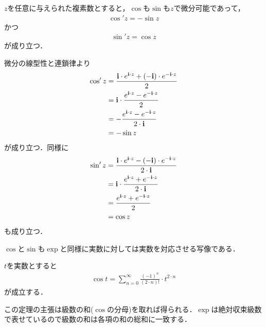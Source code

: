 	\begin{screen}
		\begin{thm}
		\label{thm:derivatives_of_trigonometric_functions}
			$z$を任意に与えられた複素数とすると，$\cos$も$\sin$も$z$で微分可能であって，
			\begin{align}
				\cos'{z} = - \sin{z}
			\end{align}
			かつ
			\begin{align}
				\sin'{z} = \cos{z}
			\end{align}
			が成り立つ．
		\end{thm}
	\end{screen}
	
	\begin{sketch}
		微分の線型性と連鎖律より
		\begin{align}
			\cos'{z}
			&= \frac{\mathbf{i} \cdot e^{\mathbf{i} \cdot z} + (-\mathbf{i}) \cdot e^{-\mathbf{i} \cdot z}}{2} \\
			&= \mathbf{i} \cdot \frac{e^{\mathbf{i} \cdot z} - e^{-\mathbf{i} \cdot z}}{2} \\
			&= -\frac{e^{\mathbf{i} \cdot z} - e^{-\mathbf{i} \cdot z}}{2 \cdot \mathbf{i}} \\
			&= -\sin{z}
		\end{align}
		が成り立つ．同様に
		\begin{align}
			\sin'{z}
			&= \frac{\mathbf{i} \cdot e^{\mathbf{i} \cdot z} - (-\mathbf{i}) \cdot e^{-\mathbf{i} \cdot z}}{2 \cdot \mathbf{i}} \\
			&= \mathbf{i} \cdot \frac{e^{\mathbf{i} \cdot z} + e^{-\mathbf{i} \cdot z}}{2 \cdot \mathbf{i}} \\
			&= \frac{e^{\mathbf{i} \cdot z} + e^{-\mathbf{i} \cdot z}}{2} \\
			&= \cos{z}
		\end{align}
		も成り立つ．
		\QED
	\end{sketch}
	
	$\cos$と$\sin$も$\exp$と同様に実数に対しては実数を対応させる写像である．
	\begin{screen}
		\begin{thm}[余弦は実数に対して実数を対応させる]
			$t$を実数とすると
			\begin{align}
				\cos{t} = \sum_{n=0}^\infty \frac{(-1)^{n}}{(2 \cdot n)!} \cdot t^{2 \cdot n}
			\end{align}
			が成立する．
		\end{thm}
	\end{screen}
	
	この定理の主張は級数の和($\cos$の分母)を取れば得られる．$\exp$は絶対収束級数で表せているので級数の和は各項の和の総和に一致する．
	
